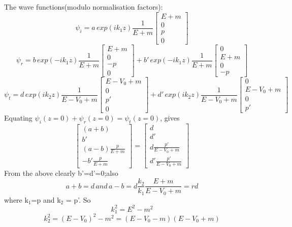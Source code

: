 \documentclass[11pt]{article}
\begin{document}
	 The wave functions(modulo normalisation factors):
	 \[
	 	\psi_i = a\, exp(ik_1z)\frac{1}{E+m}\begin{bmatrix}E+m\\0\\p\\0\end{bmatrix}
	 \]	
	 \[
	 	\psi_r = b\, exp(-ik_1z)\frac{1}{E+m}\begin{bmatrix}E+m\\0\\-p\\0\end{bmatrix} + b'\, exp(-ik_1z)\frac{1}{E+m}\begin{bmatrix}0\\E+m\\0\\-p\end{bmatrix}
	 \]
	 \[
	 \psi_t = d\, exp(ik_2z)\frac{1}{E-V_0+m}\begin{bmatrix}E-V_0+m\\0\\p'\\0\end{bmatrix} + d'\, exp(ik_2z)\frac{1}{E-V_0+m}\begin{bmatrix}0\\E-V_0+m\\0\\p'\end{bmatrix}
	 \]
	 Equating \(\psi_i(z=0)+\psi_r(z=0) = \psi_t(z=0)\), gives
	\[
		\begin{bmatrix}(a+b)\\b'\\(a-b)\frac{p}{E+m}\\-b'\frac{p}{E+m}\end{bmatrix} = \begin{bmatrix}d\\d'\\d\frac{p'}{E-V_0+m}\\d'\frac{p'}{E-V_0+m}\end{bmatrix}
	\]	 	 
	 From the above clearly b'=d'=0;also\\
	\[ a+b=d \, and \, a-b = d\frac{k_2}{k_1}\frac{E+m}{E-V_0+m} =rd \]
	where k$_1$=p and k$_2$ = p'. So
	\[
		k_1^2 = E^2 - m^2 
	\]
	\[
		k_2^2 = (E-V_0)^2 - m^2 = (E-V_0-m)(E-V_0+m)
	\]
\end{document}
